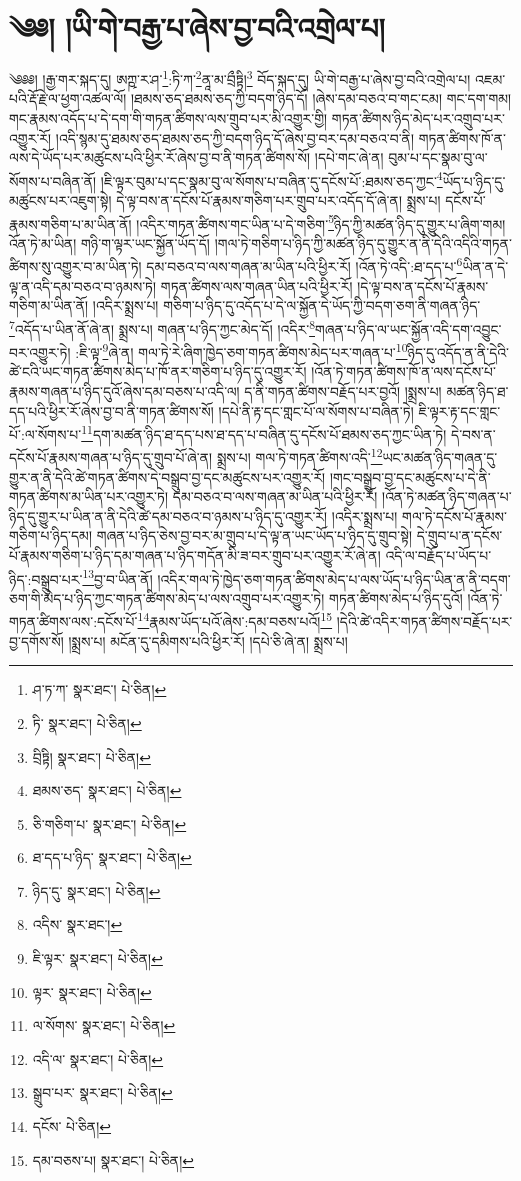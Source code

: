 \setcounter{footnote}{0} 
\chapter{༄༅། །ཡི་གེ་བརྒྱ་པ་ཞེས་བྱ་བའི་འགྲེལ་པ།}༄༅༅། །རྒྱ་གར་སྐད་དུ། ཨཀྵ་ར་ཤ་\footnote{ཤ་ཏ་ཀ་  སྣར་ཐང་།  པེ་ཅིན། }:ཏི་ཀ་\footnote{ཏི་  སྣར་ཐང་།  པེ་ཅིན། }ནཱ་མ་བྲྀཏྟི།\footnote{བྲིཏྟི།  སྣར་ཐང་།  པེ་ཅིན། } བོད་སྐད་དུ། ཡི་གེ་བརྒྱ་པ་ཞེས་བྱ་བའི་འགྲེལ་པ། འཇམ་པའི་རྡོ་རྗེ་ལ་ཕྱག་འཚལ་ལོ། །ཐམས་ཅད་ཐམས་ཅད་ཀྱི་བདག་ཉིད་དོ། །ཞེས་དམ་བཅའ་བ་གང་ངམ། གང་དག་གམ། གང་རྣམས་འདོད་པ་དེ་དག་གི་གཏན་ཚིགས་ལས་གྲུབ་པར་མི་འགྱུར་གྱི། གཏན་ཚིགས་ཉིད་མེད་པར་འགྲུབ་པར་འགྱུར་རོ། །འདི་སྙམ་དུ་ཐམས་ཅད་ཐམས་ཅད་ཀྱི་བདག་ཉིད་དོ་ཞེས་བྱ་བར་དམ་བཅའ་བ་ནི། གཏན་ཚིགས་ཁོ་ན་ལས་དེ་ཡོད་པར་མཚུངས་པའི་ཕྱིར་རོ་ཞེས་བྱ་བ་ནི་གཏན་ཚིགས་སོ། །དཔེ་གང་ཞེ་ན། བུམ་པ་དང་སྣམ་བུ་ལ་སོགས་པ་བཞིན་ནོ། །ཇི་ལྟར་བུམ་པ་དང་སྣམ་བུ་ལ་སོགས་པ་བཞིན་དུ་དངོས་པོ་:ཐམས་ཅད་ཀྱང་\footnote{ཐམས་ཅད་  སྣར་ཐང་།  པེ་ཅིན། }ཡོད་པ་ཉིད་དུ་མཚུངས་པར་འཇུག་སྟེ། དེ་ལྟ་བས་ན་དངོས་པོ་རྣམས་གཅིག་པར་གྲུབ་པར་འདོད་དོ་ཞེ་ན། སྨྲས་པ། དངོས་པོ་རྣམས་གཅིག་པ་མ་ཡིན་ནོ། །འདིར་གཏན་ཚིགས་གང་ཡིན་པ་དེ་གཅིག་\footnote{ཅི་གཅིག་པ་  སྣར་ཐང་།  པེ་ཅིན། }ཉིད་ཀྱི་མཚན་ཉིད་དུ་གྱུར་པ་ཞིག་གམ། འོན་ཏེ་མ་ཡིན། གཉི་ག་ལྟར་ཡང་སྐྱོན་ཡོད་དོ། །གལ་ཏེ་གཅིག་པ་ཉིད་ཀྱི་མཚན་ཉིད་དུ་གྱུར་ན་ནི་དེའི་འདིའི་གཏན་ཚིགས་སུ་འགྱུར་བ་མ་ཡིན་ཏེ། དམ་བཅའ་བ་ལས་གཞན་མ་ཡིན་པའི་ཕྱིར་རོ། །འོན་ཏེ་འདི་:ཐ་དད་པ་\footnote{ཐ་དད་པ་ཉིད་  སྣར་ཐང་།  པེ་ཅིན། }ཡིན་ན་དེ་ལྟ་ན་འདི་དམ་བཅའ་བ་ཉམས་ཏེ། གཏན་ཚིགས་ལས་གཞན་ཡིན་པའི་ཕྱིར་རོ། །དེ་ལྟ་བས་ན་དངོས་པོ་རྣམས་གཅིག་མ་ཡིན་ནོ། །འདིར་སྨྲས་པ། གཅིག་པ་ཉིད་དུ་འདོད་པ་དེ་ལ་སྐྱོན་དེ་ཡོད་ཀྱི་བདག་ཅག་ནི་གཞན་ཉིད་\footnote{ཉིད་དུ་  སྣར་ཐང་།  པེ་ཅིན། }འདོད་པ་ཡིན་ནོ་ཞེ་ན། སྨྲས་པ། གཞན་པ་ཉིད་ཀྱང་མེད་དོ། །འདིར་\footnote{འདིས་  སྣར་ཐང་། }གཞན་པ་ཉིད་ལ་ཡང་སྐྱོན་འདི་དག་འབྱུང་བར་འགྱུར་ཏེ། :ཇི་ལྟ་\footnote{ཇི་ལྟར་  སྣར་ཐང་།  པེ་ཅིན། }ཞེ་ན། གལ་ཏེ་རེ་ཞིག་ཁྱེད་ཅག་གཏན་ཚིགས་མེད་པར་གཞན་པ་\footnote{ལྟར་  སྣར་ཐང་།  པེ་ཅིན། }ཉིད་དུ་འདོད་ན་ནི་དེའི་ཚེ་ངའི་ཡང་གཏན་ཚིགས་མེད་པ་ཁོ་ནར་གཅིག་པ་ཉིད་དུ་འགྱུར་རོ། །འོན་ཏེ་གཏན་ཚིགས་ཁོ་ན་ལས་དངོས་པོ་རྣམས་གཞན་པ་ཉིད་དུའོ་ཞེས་དམ་བཅས་པ་འདི་ལ། ད་ནི་གཏན་ཚིགས་བརྗོད་པར་བྱའོ། །སྨྲས་པ། མཚན་ཉིད་ཐ་དད་པའི་ཕྱིར་རོ་ཞེས་བྱ་བ་ནི་གཏན་ཚིགས་སོ། །དཔེ་ནི་རྟ་དང་གླང་པོ་ལ་སོགས་པ་བཞིན་ཏེ། ཇི་ལྟར་རྟ་དང་གླང་པོ་:ལ་སོགས་པ་\footnote{ལ་སོགས་  སྣར་ཐང་།  པེ་ཅིན། }དག་མཚན་ཉིད་ཐ་དད་པས་ཐ་དད་པ་བཞིན་དུ་དངོས་པོ་ཐམས་ཅད་ཀྱང་ཡིན་ཏེ། དེ་བས་ན་དངོས་པོ་རྣམས་གཞན་པ་ཉིད་དུ་གྲུབ་པོ་ཞེ་ན། སྨྲས་པ། གལ་ཏེ་གཏན་ཚིགས་འདི་\footnote{འདི་ལ་  སྣར་ཐང་།  པེ་ཅིན། }ཡང་མཚན་ཉིད་གཞན་དུ་གྱུར་ན་ནི་དེའི་ཚེ་གཏན་ཚིགས་དེ་བསྒྲུབ་བྱ་དང་མཚུངས་པར་འགྱུར་རོ། །གང་བསྒྲུབ་བྱ་དང་མཚུངས་པ་དེ་ནི་གཏན་ཚིགས་མ་ཡིན་པར་འགྱུར་ཏེ། དམ་བཅའ་བ་ལས་གཞན་མ་ཡིན་པའི་ཕྱིར་རོ། །འོན་ཏེ་མཚན་ཉིད་གཞན་པ་ཉིད་དུ་གྱུར་པ་ཡིན་ན་ནི་དེའི་ཚེ་དམ་བཅའ་བ་ཉམས་པ་ཉིད་དུ་འགྱུར་རོ། །འདིར་སྨྲས་པ། གལ་ཏེ་དངོས་པོ་རྣམས་གཅིག་པ་ཉིད་དམ། གཞན་པ་ཉིད་ཅེས་བྱ་བར་མ་གྲུབ་པ་དེ་ལྟ་ན་ཡང་ཡོད་པ་ཉིད་དུ་གྲུབ་སྟེ། དེ་གྲུབ་པ་ན་དངོས་པོ་རྣམས་གཅིག་པ་ཉིད་དམ་གཞན་པ་ཉིད་གདོན་མི་ཟ་བར་གྲུབ་པར་འགྱུར་རོ་ཞེ་ན། འདི་ལ་བརྗོད་པ་ཡོད་པ་ཉིད་:བསྒྲུབ་པར་\footnote{སྒྲུབ་པར་  སྣར་ཐང་།  པེ་ཅིན། }བྱ་བ་ཡིན་ནོ། །འདིར་གལ་ཏེ་ཁྱེད་ཅག་གཏན་ཚིགས་མེད་པ་ལས་ཡོད་པ་ཉིད་ཡིན་ན་ནི་བདག་ཅག་གི་མེད་པ་ཉིད་ཀྱང་གཏན་ཚིགས་མེད་པ་ལས་འགྲུབ་པར་འགྱུར་ཏེ། གཏན་ཚིགས་མེད་པ་ཉིད་དུའོ། །འོན་ཏེ་གཏན་ཚིགས་ལས་:དངོས་པོ་\footnote{དངོས་  པེ་ཅིན། }རྣམས་ཡོད་པའོ་ཞེས་:དམ་བཅས་པའོ།\footnote{དམ་བཅས་པ།  སྣར་ཐང་།  པེ་ཅིན། } །དེའི་ཚེ་འདིར་གཏན་ཚིགས་བརྗོད་པར་བྱ་དགོས་སོ། །སྨྲས་པ། མངོན་དུ་དམིགས་པའི་ཕྱིར་རོ། །དཔེ་ཅི་ཞེ་ན། སྨྲས་པ། 